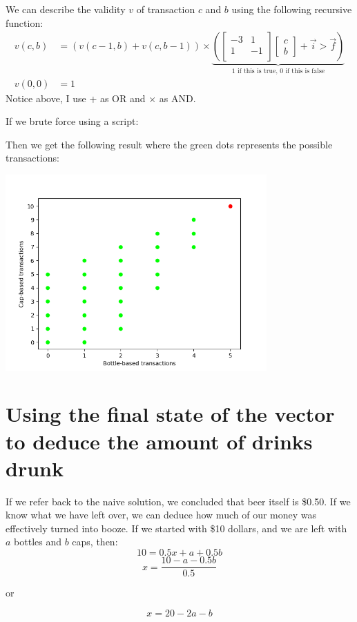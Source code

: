 \documentclass[letterpaper, 12pt]{article}
\begin{document}
We can describe the validity $v$ of transaction $c$ and $b$ using the following recursive function:
\begin{align*}
    v(c, b) &= (v(c - 1, b) + v(c, b - 1)) \times \underbrace{(
        \begin{bmatrix}
            -3 & 1\\
            1 & -1\\
        \end{bmatrix}
        \begin{bmatrix}
            c\\
            b
        \end{bmatrix}
        + \vec{i}
        >
        \vec{f}
    )}_\text{1 if this is true, 0 if this is false}\\
    v(0, 0) &= 1
\end{align*}
Notice above, I use + as OR and $\times$ as AND.

If we brute force using a script:



Then we get the following result where the green dots represents the possible transactions:
\begin{center}
    \includegraphics[width=0.75\textwidth]{python/debt.png}
\end{center}
\section{Using the final state of the vector to deduce the amount of drinks drunk}
\par If we refer back to the naive solution, we concluded that beer itself is \$0.50.
If we know what we have left over, we can deduce how much of our money was effectively turned into booze.
If we started with \$10 dollars, and we are left with $a$ bottles and $b$ caps, then:
$$10 = 0.5x + a + 0.5b$$
$$x = \frac{10 - a - 0.5b}{0.5}$$
\begin{center}
    or 
\end{center}
\begin{equation}
x = 20 - 2a - b
\end{equation}
\end{document}
